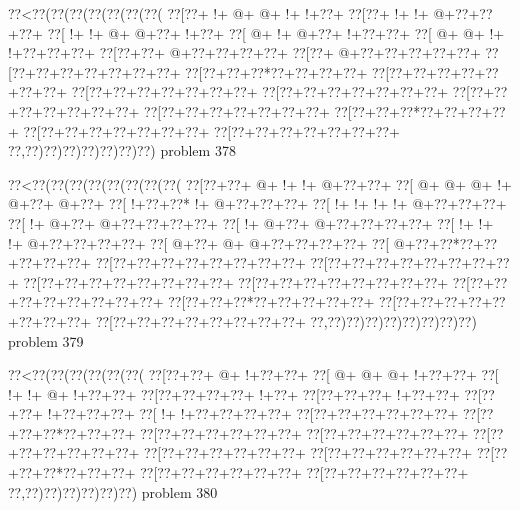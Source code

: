 \vbox{\vbox{\goo
\0??<\0??(\0??(\0??(\0??(\0??(\0??(\0??(
\0??[\0??+\- !+\- @+\- @+\- !+\- !+\0??+
\0??[\0??+\- !+\- !+\- @+\0??+\0??+\0??+
\0??[\- !+\- !+\- @+\- @+\0??+\- !+\0??+
\0??[\- @+\- !+\- @+\0??+\- !+\0??+\0??+
\0??[\- @+\- @+\- !+\- !+\0??+\0??+\0??+
\0??[\0??+\0??+\- @+\0??+\0??+\0??+\0??+
\0??[\0??+\- @+\0??+\0??+\0??+\0??+\0??+
\0??[\0??+\0??+\0??+\0??+\0??+\0??+\0??+
\0??[\0??+\0??+\0??*\0??+\0??+\0??+\0??+
\0??[\0??+\0??+\0??+\0??+\0??+\0??+\0??+
\0??[\0??+\0??+\0??+\0??+\0??+\0??+\0??+
\0??[\0??+\0??+\0??+\0??+\0??+\0??+\0??+
\0??[\0??+\0??+\0??+\0??+\0??+\0??+\0??+
\0??[\0??+\0??+\0??+\0??+\0??+\0??+\0??+
\0??[\0??+\0??+\0??*\0??+\0??+\0??+\0??+
\0??[\0??+\0??+\0??+\0??+\0??+\0??+\0??+
\0??[\0??+\0??+\0??+\0??+\0??+\0??+\0??+
\0??,\0??)\0??)\0??)\0??)\0??)\0??)\0??)
}
\hfil problem 378\hfil\break
}

\vbox{\vbox{\goo
\0??<\0??(\0??(\0??(\0??(\0??(\0??(\0??(\0??(
\0??[\0??+\0??+\- @+\- !+\- !+\- @+\0??+\0??+
\0??[\- @+\- @+\- @+\- !+\- @+\0??+\- @+\0??+
\0??[\- !+\0??+\0??*\- !+\- @+\0??+\0??+\0??+
\0??[\- !+\- !+\- !+\- !+\- @+\0??+\0??+\0??+
\0??[\- !+\- @+\0??+\- @+\0??+\0??+\0??+\0??+
\0??[\- !+\- @+\0??+\- @+\0??+\0??+\0??+\0??+
\0??[\- !+\- !+\- !+\- @+\0??+\0??+\0??+\0??+
\0??[\- @+\0??+\- @+\- @+\0??+\0??+\0??+\0??+
\0??[\- @+\0??+\0??*\0??+\0??+\0??+\0??+\0??+
\0??[\0??+\0??+\0??+\0??+\0??+\0??+\0??+\0??+
\0??[\0??+\0??+\0??+\0??+\0??+\0??+\0??+\0??+
\0??[\0??+\0??+\0??+\0??+\0??+\0??+\0??+\0??+
\0??[\0??+\0??+\0??+\0??+\0??+\0??+\0??+\0??+
\0??[\0??+\0??+\0??+\0??+\0??+\0??+\0??+\0??+
\0??[\0??+\0??+\0??*\0??+\0??+\0??+\0??+\0??+
\0??[\0??+\0??+\0??+\0??+\0??+\0??+\0??+\0??+
\0??[\0??+\0??+\0??+\0??+\0??+\0??+\0??+\0??+
\0??,\0??)\0??)\0??)\0??)\0??)\0??)\0??)\0??)
}
\hfil problem 379\hfil\break
}

\vbox{\vbox{\goo
\0??<\0??(\0??(\0??(\0??(\0??(\0??(
\0??[\0??+\0??+\- @+\- !+\0??+\0??+
\0??[\- @+\- @+\- @+\- !+\0??+\0??+
\0??[\- !+\- !+\- @+\- !+\0??+\0??+
\0??[\0??+\0??+\0??+\0??+\- !+\0??+
\0??[\0??+\0??+\0??+\- !+\0??+\0??+
\0??[\0??+\0??+\- !+\0??+\0??+\0??+
\0??[\- !+\- !+\0??+\0??+\0??+\0??+
\0??[\0??+\0??+\0??+\0??+\0??+\0??+
\0??[\0??+\0??+\0??*\0??+\0??+\0??+
\0??[\0??+\0??+\0??+\0??+\0??+\0??+
\0??[\0??+\0??+\0??+\0??+\0??+\0??+
\0??[\0??+\0??+\0??+\0??+\0??+\0??+
\0??[\0??+\0??+\0??+\0??+\0??+\0??+
\0??[\0??+\0??+\0??+\0??+\0??+\0??+
\0??[\0??+\0??+\0??*\0??+\0??+\0??+
\0??[\0??+\0??+\0??+\0??+\0??+\0??+
\0??[\0??+\0??+\0??+\0??+\0??+\0??+
\0??,\0??)\0??)\0??)\0??)\0??)\0??)
}
\hfil problem 380\hfil\break
}

